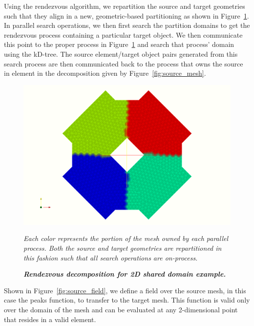 \documentclass[letterpaper,12pt]{article}
\begin{document}
Using the rendezvous algorithm, we repartition the source and target
geometries such that they align in a new, geometric-based partitioning
as shown in Figure~\ref{fig:rendezvous_part}. In parallel search
operations, we then first search the partition domains to get the
rendezvous process containing a particular target object. We then
communicate this point to the proper process in
Figure~\ref{fig:rendezvous_part} and search that process' domain using
the kD-tree. The source element/target object pairs generated from
this search process are then communicated back to the process that
owns the source in element in the decomposition given by
Figure~\ref{fig:source_mesh}.

\begin{figure}[htpb!]
  \centering \includegraphics[width=5.5in]{tri_rend.png}
  \caption{\bf \sl Rendezvous decomposition for 2D shared domain
    example.}{\sl Each color represents the portion of the mesh owned
    by each parallel process. Both the source and target geometries
    are repartitioned in this fashion such that all search operations
    are on-process.}
  \label{fig:rendezvous_part}
\end{figure}

Shown in Figure~\ref{fig:source_field}, we define a field over the
source mesh, in this case the peaks function, to transfer to the
target mesh. This function is valid only over the domain of the mesh
and can be evaluated at any 2-dimensional point that resides in a
valid element.
\end{document}
